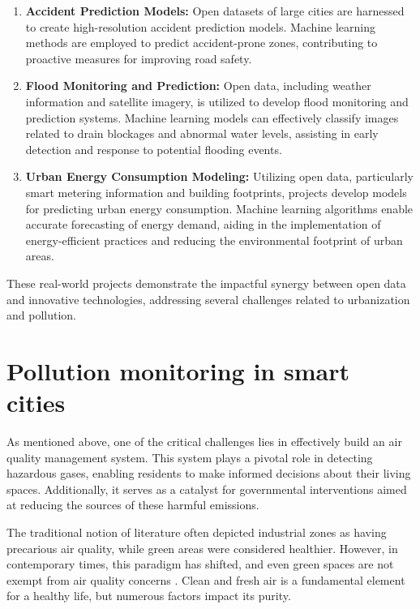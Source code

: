 \begin{enumerate}
\item \textbf{Accident Prediction Models:}
   Open datasets of large cities are harnessed to create high-resolution accident prediction models. Machine learning methods are employed to predict accident-prone zones, contributing to proactive measures for improving road safety.
   
\item \textbf{Flood Monitoring and Prediction:}
   Open data, including weather information and satellite imagery, is utilized to develop flood monitoring and prediction systems. Machine learning models can effectively classify images related to drain blockages and abnormal water levels, assisting in early detection and response to potential flooding events.

\item \textbf{Urban Energy Consumption Modeling:}
   Utilizing open data, particularly smart metering information and building footprints, projects develop models for predicting urban energy consumption. Machine learning algorithms enable accurate forecasting of energy demand, aiding in the implementation of energy-efficient practices and reducing the environmental footprint of urban areas.
\end{enumerate}

These real-world projects demonstrate the impactful synergy between open data and innovative technologies, addressing several challenges related to urbanization and pollution.

\section{Pollution monitoring in smart cities}

As mentioned above, one of the critical challenges lies in effectively build an air quality management system. This system plays a pivotal role in detecting hazardous gases, enabling residents to make informed decisions about their living spaces. Additionally, it serves as a catalyst for governmental interventions aimed at reducing the sources of these harmful emissions.

The traditional notion of literature often depicted industrial zones as having precarious air quality, while green areas were considered healthier. However, in contemporary times, this paradigm has shifted, and even green spaces are not exempt from air quality concerns \cite{rhaiemair}. Clean and fresh air is a fundamental element for a healthy life, but numerous factors impact its purity.

